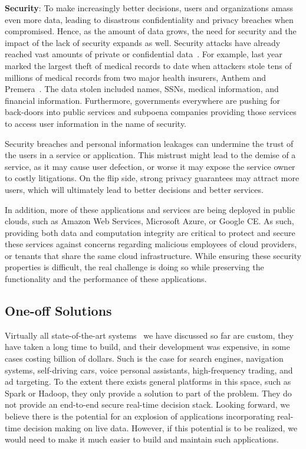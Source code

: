 {\bf Security}: To make increasingly better decisions, users and organizations amass even more data, leading to  disastrous confidentiality and privacy breaches when compromised. Hence, as the amount of data grows, the need for security and the impact of the lack of security expands as well. Security attacks have already reached vast amounts of private or confidential data~\cite{breaches2015}. For example, last year marked the largest theft of medical records to date when attackers stole tens of millions of medical records from two major health insurers, Anthem and Premera~\cite{AnthemBreach,AnthemLargest}. 
The data stolen included names, SSNs, medical information, and financial information. Furthermore, governments everywhere are pushing for back-doors into public services and subpoena companies providing those services to access user information in the name of security. 

Security breaches and personal information leakages can undermine the trust of the users in a service or application. This mistrust might lead to the demise of a service, as it may cause user defection, or worse it may expose the service owner to costly litigations. On the flip side, strong privacy guarantees may attract more users, which will ultimately lead to better decisions and better services. 

In addition, more of these applications and services are being deployed in public clouds, such as Amazon Web Services, Microsoft Azure, or Google CE. As such, providing both data and computation integrity are critical to protect and secure these services against concerns regarding malicious employees of cloud providers, or tenants that share the same cloud infrastructure. While ensuring these security properties is difficult, the real challenge is doing so while preserving the functionality and the performance of these applications.

\subsection{One-off Solutions}

Virtually all state-of-the-art systems~\cite{Agarwal14, Graepel10, Ganjam15}  we have discussed so far are custom, they have taken a long time to build, and their development was expensive, in some cases costing billion of dollars. Such is the case for search engines, navigation systems, self-driving cars, voice personal assistants, high-frequency trading, and ad targeting. To the extent there exists general platforms in this space, such as Spark or Hadoop, they only provide a solution to part of the problem. They do not  provide an end-to-end secure real-time decision stack. Looking forward, we believe there is the potential for an explosion of applications incorporating real-time decision making on live data. However, if this potential is to be realized, we would need to make it much easier to build and maintain such applications. 
